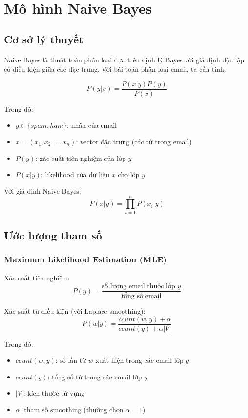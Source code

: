 \section{Mô hình Naive Bayes}

\subsection{Cơ sở lý thuyết}

Naive Bayes là thuật toán phân loại dựa trên định lý Bayes với giả định độc lập có điều kiện giữa các đặc trưng. Với bài toán phân loại email, ta cần tính:

$$P(y|x) = \frac{P(x|y)P(y)}{P(x)}$$

Trong đó:
\begin{itemize}
    \item $y \in \{spam, ham\}$: nhãn của email
    \item $x = (x_1, x_2, ..., x_n)$: vector đặc trưng (các từ trong email)
    \item $P(y)$: xác suất tiên nghiệm của lớp $y$
    \item $P(x|y)$: likelihood của dữ liệu $x$ cho lớp $y$
\end{itemize}

Với giả định Naive Bayes:
$$P(x|y) = \prod_{i=1}^{n} P(x_i|y)$$

\subsection{Ước lượng tham số}

\subsubsection{Maximum Likelihood Estimation (MLE)}
Xác suất tiên nghiệm:
$$P(y) = \frac{\text{số lượng email thuộc lớp } y}{\text{tổng số email}}$$

Xác suất từ điều kiện (với Laplace smoothing):
$$P(w|y) = \frac{count(w, y) + \alpha}{count(y) + \alpha|V|}$$

Trong đó:
\begin{itemize}
    \item $count(w, y)$: số lần từ $w$ xuất hiện trong các email lớp $y$
    \item $count(y)$: tổng số từ trong các email lớp $y$
    \item $|V|$: kích thước từ vựng
    \item $\alpha$: tham số smoothing (thường chọn $\alpha = 1$)
\end{itemize}

